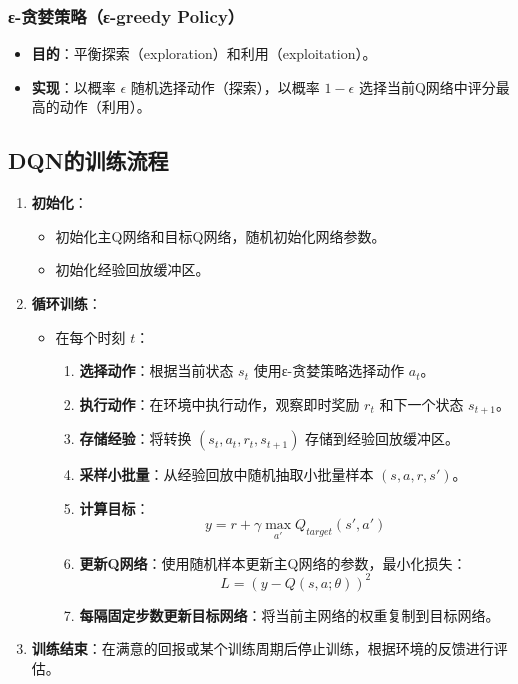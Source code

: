 \documentclass[lettersize,journal]{IEEEtran}
\begin{document}
	\subsubsection{ε-贪婪策略（ε-greedy Policy）}  
	\begin{itemize}  
		\item \textbf{目的}：平衡探索（exploration）和利用（exploitation）。  
		\item \textbf{实现}：以概率 $ \epsilon $ 随机选择动作（探索），以概率 $ 1 - \epsilon $ 选择当前Q网络中评分最高的动作（利用）。  
	\end{itemize}  
	
    \subsection{DQN的训练流程}  
    \begin{enumerate}  
	\item \textbf{初始化}：  
	\begin{itemize}  
		\item 初始化主Q网络和目标Q网络，随机初始化网络参数。  
		\item 初始化经验回放缓冲区。  
	\end{itemize}  
	
	\item \textbf{循环训练}：  
	\begin{itemize}  
		\item 在每个时刻 $ t $：  
		\begin{enumerate}  
			\item \textbf{选择动作}：根据当前状态 $ s_t $ 使用ε-贪婪策略选择动作 $ a_t $。  
			\item \textbf{执行动作}：在环境中执行动作，观察即时奖励 $ r_t $ 和下一个状态 $ s_{t+1} $。  
			\item \textbf{存储经验}：将转换 $ (s_t, a_t, r_t, s_{t+1}) $ 存储到经验回放缓冲区。  
			\item \textbf{采样小批量}：从经验回放中随机抽取小批量样本 $ (s, a, r, s') $。  
			\item \textbf{计算目标}：  
			\begin{equation}  
				y = r + \gamma \max_{a'} Q_{target}(s', a')  
			\end{equation}  
			\item \textbf{更新Q网络}：使用随机样本更新主Q网络的参数，最小化损失：  
			\begin{equation}  
				L = (y - Q(s, a; \theta))^2  
			\end{equation}  
			\item \textbf{每隔固定步数更新目标网络}：将当前主网络的权重复制到目标网络。  
		\end{enumerate}  
	\end{itemize}  
	
	\item \textbf{训练结束}：在满意的回报或某个训练周期后停止训练，根据环境的反馈进行评估。  
\end{enumerate}  
\end{document}
